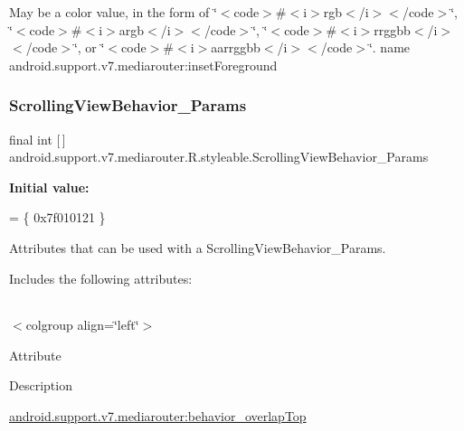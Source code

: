 May be a color value, in the form of \char`\"{}$<$code$>$\#$<$i$>$rgb$<$/i$>$$<$/code$>$\char`\"{}, \char`\"{}$<$code$>$\#$<$i$>$argb$<$/i$>$$<$/code$>$\char`\"{}, \char`\"{}$<$code$>$\#$<$i$>$rrggbb$<$/i$>$$<$/code$>$\char`\"{}, or \char`\"{}$<$code$>$\#$<$i$>$aarrggbb$<$/i$>$$<$/code$>$\char`\"{}.  name android.\+support.\+v7.\+mediarouter\+:inset\+Foreground \mbox{\label{classandroid_1_1support_1_1v7_1_1mediarouter_1_1R_1_1styleable_a2b45e98021da441a2c6395c20bd5196c}} 
\subsubsection{\texorpdfstring{Scrolling\+View\+Behavior\+\_\+\+Params}{ScrollingViewBehavior\_Params}}
{\footnotesize\ttfamily final int \mbox{[}$\,$\mbox{]} android.\+support.\+v7.\+mediarouter.\+R.\+styleable.\+Scrolling\+View\+Behavior\+\_\+\+Params\hspace{0.3cm}{\ttfamily [static]}}

{\bfseries Initial value\+:}
\begin{DoxyCode}
= \{
            0x7f010121
        \}
\end{DoxyCode}
Attributes that can be used with a Scrolling\+View\+Behavior\+\_\+\+Params. 

Includes the following attributes\+:

\tabulinesep=1mm
\begin{longtabu} spread 0pt [c]{*{0}{|X[-1]}|}
\hline
\end{longtabu}
$<$colgroup align=\char`\"{}left\char`\"{}$>$ 

Attribute

Description 

{\ttfamily \hyperlink{classandroid_1_1support_1_1v7_1_1mediarouter_1_1R_1_1styleable_a6677a8ccfe953f468119c97a9f22aa0a}{android.\+support.\+v7.\+mediarouter\+:behavior\+\_\+overlap\+Top}}

